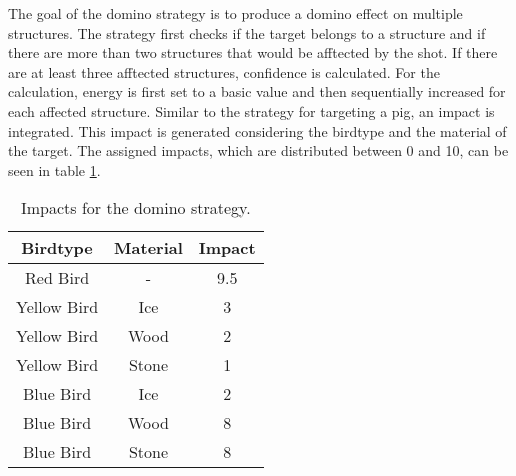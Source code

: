 The goal of the domino strategy is to produce a domino effect on multiple structures. The strategy first checks if the target belongs to a structure and if there are more than two structures that would be afftected by the shot. If there are at least three afftected structures, confidence is calculated. For the calculation, energy is first set to a basic value and then sequentially increased for each affected structure. Similar to the strategy for targeting a pig, an impact is integrated. This impact is generated considering the birdtype and the material of the target. The assigned impacts, which are distributed between 0 and 10, can be seen in table \ref{tab:dominoimpact}. \\

\begin{table}[h]
\begin{center}
\begin{tabular}{c|c|c}
Birdtype & Material & Impact\\
\hline
Red Bird & - & 9.5\\
Yellow Bird&Ice&3\\
Yellow Bird&Wood&2\\
Yellow Bird&Stone&1\\
Blue Bird&Ice&2\\
Blue Bird&Wood&8\\
Blue Bird&Stone&8\\
\end{tabular}
\end{center}
\caption{Impacts for the domino strategy.\label{tab:dominoimpact}}
\end{table}